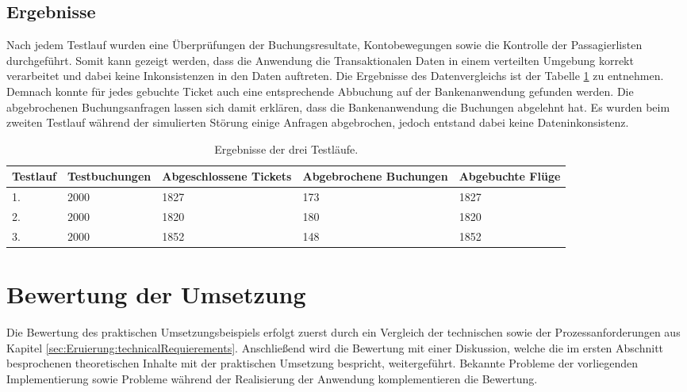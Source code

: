 \subsection{Ergebnisse}
\label{subsec:evaluation:resultsTestRuns}
Nach jedem Testlauf wurden eine Überprüfungen der Buchungsresultate, Kontobewegungen sowie die Kontrolle der Passagierlisten durchgeführt. Somit kann gezeigt werden, dass die Anwendung die Transaktionalen Daten in einem verteilten Umgebung korrekt verarbeitet und dabei keine Inkonsistenzen in den Daten auftreten. Die Ergebnisse des Datenvergleichs ist der Tabelle \ref{tab:evaluation:resultsTestRuns} zu entnehmen. Demnach konnte für jedes gebuchte Ticket auch eine entsprechende Abbuchung auf der Bankenanwendung gefunden werden. Die abgebrochenen Buchungsanfragen lassen sich damit erklären, dass die Bankenanwendung die Buchungen abgelehnt hat. Es wurden beim zweiten Testlauf während der simulierten Störung einige Anfragen abgebrochen, jedoch entstand dabei keine Dateninkonsistenz.
\begin{table}
  \centering
  \begin{tabular}{p{1.5 cm} p{2.5 cm} p{2.5 cm} p{2.5 cm} p{2.5 cm}}
    Testlauf  & Testbuchungen    &  Abgeschlossene Tickets & Abgebrochene Buchungen & Abgebuchte Flüge \\ \hline
      1.   & 2000        &     1827       &   173        &     1827    \\
      2.   & 2000        &     1820       &   180        &     1820    \\
      3.   & 2000        &     1852       &   148        &     1852    
  \end{tabular}
  \caption{Ergebnisse der drei Testläufe.}
  \label{tab:evaluation:resultsTestRuns}
\end{table}

\section{Bewertung der Umsetzung}
\label{cha:rating}
Die Bewertung des praktischen Umsetzungsbeispiels erfolgt zuerst durch ein Vergleich der technischen sowie der Prozessanforderungen aus Kapitel \ref{sec:Eruierung:technicalRequierements}. Anschließend wird die Bewertung mit einer Diskussion, welche die im ersten Abschnitt besprochenen theoretischen Inhalte mit der praktischen Umsetzung bespricht, weitergeführt. Bekannte Probleme der vorliegenden Implementierung sowie Probleme während der Realisierung der Anwendung komplementieren die Bewertung.

